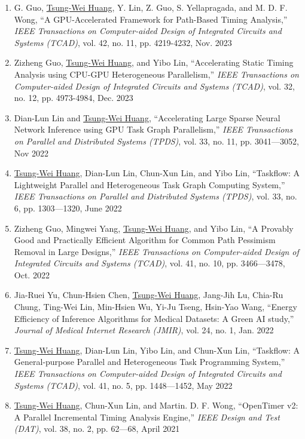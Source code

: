 \documentclass[A4,11pt]{article}
\begin{document}
 \begin{enumerate}
 \itemsep-3pt
  \item G. Guo, \underline{Tsung-Wei Huang}, Y. Lin, Z. Guo, S. Yellapragada, and M. D. F. Wong, ``A GPU-Accelerated Framework for Path-Based Timing Analysis,'' \textit{IEEE Transactions on Computer-aided Design of Integrated Circuits and Systems (TCAD)}, vol. 42, no. 11, pp. 4219-4232, Nov. 2023
  \item Zizheng Guo, \underline{Tsung-Wei Huang}, and Yibo Lin, ``Accelerating Static Timing Analysis using CPU-GPU Heterogeneous Parallelism,'' \textit{IEEE Transactions on Computer-aided Design of Integrated Circuits and Systems (TCAD)}, vol. 32, no. 12, pp. 4973-4984, Dec. 2023
  \item Dian-Lun Lin and \underline{Tsung-Wei Huang}, ``Accelerating Large Sparse Neural Network Inference using GPU Task Graph Parallelism,'' \textit{IEEE Transactions on Parallel and Distributed Systems (TPDS)}, vol. 33, no. 11, pp. 3041—3052, Nov 2022
  \item \underline{Tsung-Wei Huang}, Dian-Lun Lin, Chun-Xun Lin, and Yibo Lin, ``Taskflow: A Lightweight Parallel and Heterogeneous Task Graph Computing System,'' \textit{IEEE Transactions on Parallel and Distributed Systems (TPDS)}, vol. 33, no. 6, pp. 1303—1320, June 2022
  \item Zizheng Guo, Mingwei Yang, \underline{Tsung-Wei Huang}, and Yibo Lin, ``A Provably Good and Practically Efficient Algorithm for Common Path Pessimism Removal in Large Designs,'' \textit{IEEE Transactions on Computer-aided Design of Integrated Circuits and Systems (TCAD)}, vol. 41, no. 10, pp. 3466—3478, Oct. 2022
  \item Jia-Ruei Yu, Chun-Hsien Chen, \underline{Tsung-Wei Huang}, Jang-Jih Lu, Chia-Ru Chung, Ting-Wei Lin, Min-Hsien Wu, Yi-Ju Tseng, Hsin-Yao Wang, ``Energy Efficiency of Inference Algorithms for Medical Datasets: A Green AI study,'' \textit{Journal of Medical Internet Research (JMIR)}, vol. 24, no. 1, Jan. 2022
  \item \underline{Tsung-Wei Huang}, Dian-Lun Lin, Yibo Lin, and Chun-Xun Lin, ``Taskflow: A General-purpose Parallel and Heterogeneous Task Programming System,'' \textit{IEEE Transactions on Computer-aided Design of Integrated Circuits and Systems (TCAD)}, vol. 41, no. 5, pp. 1448—1452, May 2022
  \item \underline{Tsung-Wei Huang}, Chun-Xun Lin, and Martin. D. F. Wong, ``OpenTimer v2: A Parallel Incremental Timing Analysis Engine,'' \textit{IEEE Design and Test (DAT)}, vol. 38, no. 2, pp. 62—68, April 2021

\end{enumerate}
\end{document}
